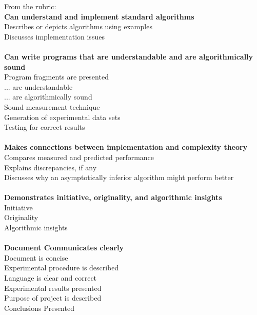 \documentclass{IEEEtran}
\begin{document}
\pagebreak
\noindent
From the rubric:\\
\textbf{Can understand and implement standard algorithms}\\
Describes or depicts algorithms using examples\\
Discusses implementation issues\\
\\
\textbf{Can write programs that are understandable and are algorithmically sound}\\
Program fragments are presented\\
... are understandable\\
... are algorithmically sound\\
Sound measurement technique\\
Generation of experimental data sets\\
Testing for correct results\\
\\
\textbf{Makes connections between implementation and complexity theory}\\
Compares measured and predicted performance\\
Explains discrepancies, if any\\
Discusses why an asymptotically inferior algorithm might perform better\\
\\
\textbf{Demonstrates initiative, originality, and algorithmic insights}\\
Initiative\\
Originality\\
Algorithmic insights\\
\\
\textbf{Document Communicates clearly}\\
Document is concise \\
Experimental procedure is described \\
Language is clear and correct \\
Experimental results presented \\
Purpose of project is described \\
Conclusions Presented \\

\pagebreak


\end{document}
